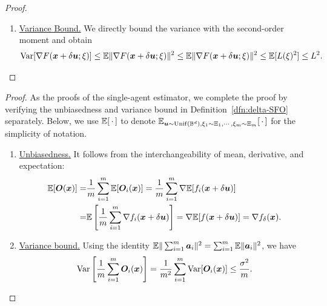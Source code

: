 \begin{proof}
\begin{enumerate}
		\item \underline{Variance Bound.} We directly bound the variance with the second-order moment and obtain
		\begin{align*}
			{\rm Var}[ \nabla F({\bm{x}}+ \delta {\bm{u}}; \xi)] \le 
			\mathbb{E} \Vert \nabla F({\bm{x}} + \delta {\bm{u}};\xi) \Vert^2 \le \mathbb{E} \Vert \nabla F({\bm{x}}+ \delta {\bm{u}} ; \xi) \Vert^2 \le \mathbb{E}[L(\xi)^2] \le L^2.
		\end{align*}
	\end{enumerate}
	
\end{proof}

\propdist* 

\begin{proof}
	As the proofs of the single-agent estimator, we complete the proof by verifying the unbiasedness and variance bound in Definition~\ref{dfn:delta-SFO} separately. Below, we use $\mathbb{E}[\,\cdot\,]$ to denote $\mathbb{E}_{{\bm{u}} \sim {\rm Unif}({\mathbb{B}}^d), \xi_1 \sim \Xi_1,\cdots,\xi_m \sim \Xi_m}[\,\cdot\,]$ for the simplicity of notation.
	\begin{enumerate}
		\item \underline{Unbiasedness.} It follows from the interchangeability of mean, derivative, and expectation:
		\begin{align*}
			\mathbb{E}[{\bm{O}}({\bm{x}})] =&  \frac{1}{m} \sum_{i=1}^m \mathbb{E} [ {\bm{O}}_i({\bm{x}})] =   \frac{1}{m} \sum_{i=1}^m \nabla \mathbb{E}[ f_i( {\bm{x}} + \delta {\bm{u}})]  \\
			=&\mathbb{E} \left[  \frac{1}{m}  \sum_{i=1}^m  \nabla f_i({\bm{x}}+ \delta {\bm{u}}) \right] = \nabla \mathbb{E}[f({\bm{x}}+\delta {\bm{u}})] = \nabla f_\delta({\bm{x}}).
		\end{align*}
		\item \underline{Variance bound.} Using the identity $\mathbb{E} \Vert \sum_{i=1}^m {\bm{a}}_i \Vert^2 =  \sum_{i=1}^m \mathbb{E} \Vert {\bm{a}}_i \Vert^2$, we have
		\begin{align*}
			{\rm Var}\left[ \frac{1}{m} \sum_{i=1}^m {\bm{O}}_i({\bm{x}}) \right] = \frac{1}{m^2} \sum_{i=1}^m {\rm Var}[{\bm{O}}_i({\bm{x}})] \le \frac{\sigma^2}{m}.
		\end{align*}
	\end{enumerate}
\end{proof}




